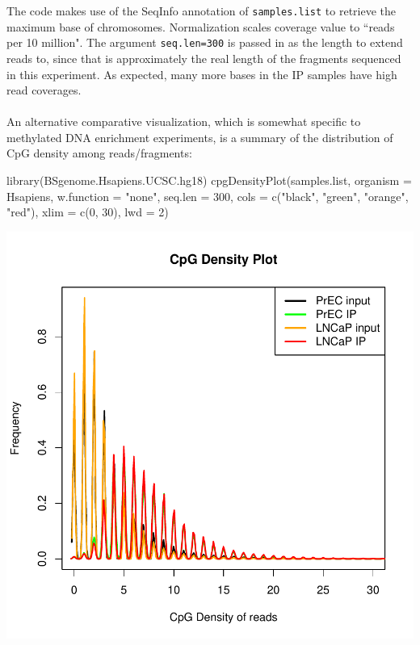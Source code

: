 \noindent The code makes use of the SeqInfo annotation of \texttt{samples.list} to retrieve the maximum base of chromosomes.  Normalization scales coverage value to ``reads per 10 million". The argument \texttt{seq.len=300} is passed in as the length to extend reads to, since that is approximately the real length of the fragments sequenced in this experiment. As expected, many more bases in the IP samples have high read coverages. \\
\ \\
An alternative comparative visualization, which is somewhat specific to methylated DNA enrichment experiments, is a summary of the distribution of CpG density among reads/fragments:

\begin{Schunk}
\begin{Sinput}
 library(BSgenome.Hsapiens.UCSC.hg18)
 cpgDensityPlot(samples.list, organism = Hsapiens, w.function = "none", seq.len = 300,
                cols = c("black", "green", "orange", "red"), xlim = c(0, 30), lwd = 2)
\end{Sinput}
\end{Schunk}
\includegraphics{qc-cpgPlot}

